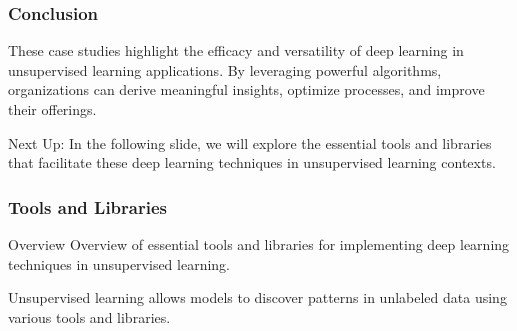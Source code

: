 \documentclass[aspectratio=169]{beamer}
\begin{document}
\begin{frame}[fragile]
  \frametitle{Conclusion}
  These case studies highlight the efficacy and versatility of deep learning in unsupervised learning applications. By leveraging powerful algorithms, organizations can derive meaningful insights, optimize processes, and improve their offerings.
  
  \begin{block}{Next Up:}
    In the following slide, we will explore the essential tools and libraries that facilitate these deep learning techniques in unsupervised learning contexts.
  \end{block}
\end{frame}

\begin{frame}[fragile]
    \frametitle{Tools and Libraries}
    \begin{block}{Overview}
        Overview of essential tools and libraries for implementing deep learning techniques in unsupervised learning.
    \end{block}

    Unsupervised learning allows models to discover patterns in unlabeled data using various tools and libraries.
\end{frame}
\end{document}
